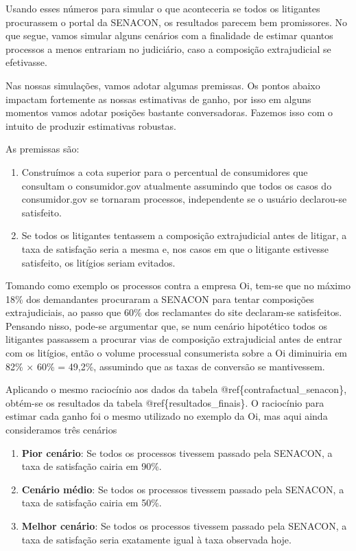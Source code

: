 \documentclass[]{report}
\providecommand{\tightlist}{%
  \setlength{\itemsep}{0pt}\setlength{\parskip}{0pt}}
\begin{document}
Usando esses números para simular o que aconteceria se todos os
litigantes procurassem o portal da SENACON, os resultados parecem bem
promissores. No que segue, vamos simular alguns cenários com a
finalidade de estimar quantos processos a menos entrariam no judiciário,
caso a composição extrajudicial se efetivasse.

Nas nossas simulações, vamos adotar algumas premissas. Os pontos abaixo
impactam fortemente as nossas estimativas de ganho, por isso em alguns
momentos vamos adotar posições bastante conversadoras. Fazemos isso com
o intuito de produzir estimativas robustas.

As premissas são:

\begin{enumerate}
\def\labelenumi{\arabic{enumi}.}
\tightlist
\item
  Construímos a cota superior para o percentual de consumidores que
  consultam o consumidor.gov atualmente assumindo que todos os casos do
  consumidor.gov se tornaram processos, independente se o usuário
  declarou-se satisfeito.
\item
  Se todos os litigantes tentassem a composição extrajudicial antes de
  litigar, a taxa de satisfação seria a mesma e, nos casos em que o
  litigante estivesse satisfeito, os litígios seriam evitados.
\end{enumerate}

Tomando como exemplo os processos contra a empresa Oi, tem-se que no
máximo 18\% dos demandantes procuraram a SENACON para tentar composições
extrajudiciais, ao passo que 60\% dos reclamantes do site declaram-se
satisfeitos. Pensando nisso, pode-se argumentar que, se num cenário
hipotético todos os litigantes passassem a procurar vias de composição
extrajudicial antes de entrar com os litígios, então o volume processual
consumerista sobre a Oi diminuiria em 82\% \(\times\) 60\% = 49,2\%,
assumindo que as taxas de conversão se mantivessem.

Aplicando o mesmo raciocínio aos dados da tabela
@ref\{contrafactual\_senacon\}, obtém-se os resultados da tabela
@ref\{resultados\_finais\}. O raciocínio para estimar cada ganho foi o
mesmo utilizado no exemplo da Oi, mas aqui ainda consideramos três
cenários

\begin{enumerate}
\def\labelenumi{\arabic{enumi}.}
\tightlist
\item
  \textbf{Pior cenário}: Se todos os processos tivessem passado pela
  SENACON, a taxa de satisfação cairia em 90\%.
\item
  \textbf{Cenário médio}: Se todos os processos tivessem passado pela
  SENACON, a taxa de satisfação cairia em 50\%.
\item
  \textbf{Melhor cenário}: Se todos os processos tivessem passado pela
  SENACON, a taxa de satisfação seria exatamente igual à taxa observada
  hoje.
\end{enumerate}
\end{document}
